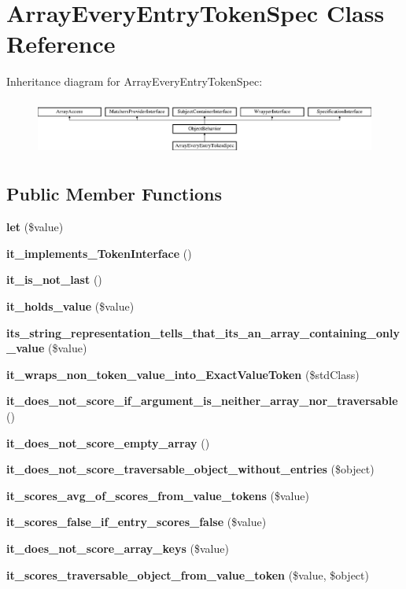 \section{Array\+Every\+Entry\+Token\+Spec Class Reference}
\label{classspec_1_1_prophecy_1_1_argument_1_1_token_1_1_array_every_entry_token_spec}
Inheritance diagram for Array\+Every\+Entry\+Token\+Spec\+:\begin{figure}[H]
\begin{center}
\leavevmode
\includegraphics[height=1.866667cm]{classspec_1_1_prophecy_1_1_argument_1_1_token_1_1_array_every_entry_token_spec}
\end{center}
\end{figure}
\subsection*{Public Member Functions}
\begin{DoxyCompactItemize}
\item 
{\bf let} (\$value)
\item 
{\bf it\+\_\+implements\+\_\+\+Token\+Interface} ()
\item 
{\bf it\+\_\+is\+\_\+not\+\_\+last} ()
\item 
{\bf it\+\_\+holds\+\_\+value} (\$value)
\item 
{\bf its\+\_\+string\+\_\+representation\+\_\+tells\+\_\+that\+\_\+its\+\_\+an\+\_\+array\+\_\+containing\+\_\+only\+\_\+value} (\$value)
\item 
{\bf it\+\_\+wraps\+\_\+non\+\_\+token\+\_\+value\+\_\+into\+\_\+\+Exact\+Value\+Token} (\$std\+Class)
\item 
{\bf it\+\_\+does\+\_\+not\+\_\+score\+\_\+if\+\_\+argument\+\_\+is\+\_\+neither\+\_\+array\+\_\+nor\+\_\+traversable} ()
\item 
{\bf it\+\_\+does\+\_\+not\+\_\+score\+\_\+empty\+\_\+array} ()
\item 
{\bf it\+\_\+does\+\_\+not\+\_\+score\+\_\+traversable\+\_\+object\+\_\+without\+\_\+entries} (\$object)
\item 
{\bf it\+\_\+scores\+\_\+avg\+\_\+of\+\_\+scores\+\_\+from\+\_\+value\+\_\+tokens} (\$value)
\item 
{\bf it\+\_\+scores\+\_\+false\+\_\+if\+\_\+entry\+\_\+scores\+\_\+false} (\$value)
\item 
{\bf it\+\_\+does\+\_\+not\+\_\+score\+\_\+array\+\_\+keys} (\$value)
\item 
{\bf it\+\_\+scores\+\_\+traversable\+\_\+object\+\_\+from\+\_\+value\+\_\+token} (\$value, \$object)
\end{DoxyCompactItemize}
